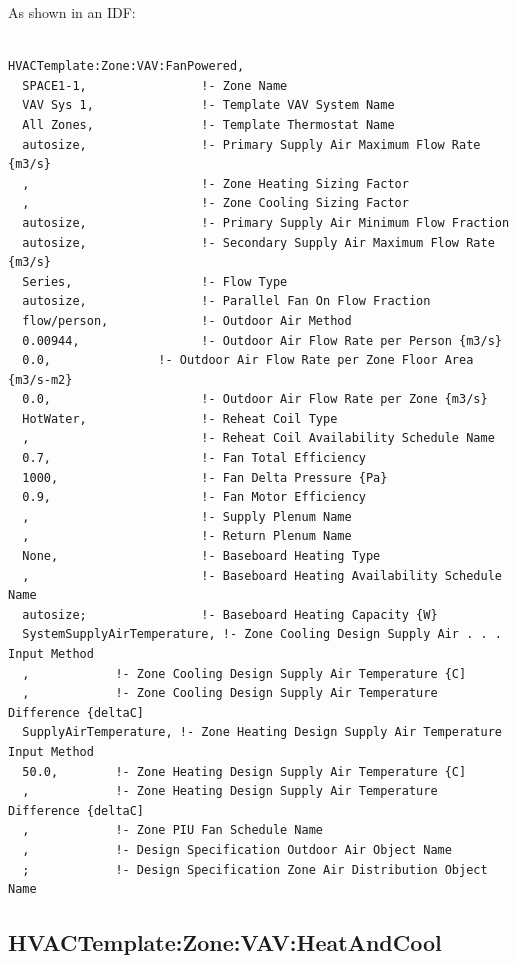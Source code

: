 As shown in an IDF:

\begin{lstlisting}

HVACTemplate:Zone:VAV:FanPowered,
  SPACE1-1,                !- Zone Name
  VAV Sys 1,               !- Template VAV System Name
  All Zones,               !- Template Thermostat Name
  autosize,                !- Primary Supply Air Maximum Flow Rate {m3/s}
  ,                        !- Zone Heating Sizing Factor
  ,                        !- Zone Cooling Sizing Factor
  autosize,                !- Primary Supply Air Minimum Flow Fraction
  autosize,                !- Secondary Supply Air Maximum Flow Rate {m3/s}
  Series,                  !- Flow Type
  autosize,                !- Parallel Fan On Flow Fraction
  flow/person,             !- Outdoor Air Method
  0.00944,                 !- Outdoor Air Flow Rate per Person {m3/s}
  0.0,               !- Outdoor Air Flow Rate per Zone Floor Area {m3/s-m2}
  0.0,                     !- Outdoor Air Flow Rate per Zone {m3/s}
  HotWater,                !- Reheat Coil Type
  ,                        !- Reheat Coil Availability Schedule Name
  0.7,                     !- Fan Total Efficiency
  1000,                    !- Fan Delta Pressure {Pa}
  0.9,                     !- Fan Motor Efficiency
  ,                        !- Supply Plenum Name
  ,                        !- Return Plenum Name
  None,                    !- Baseboard Heating Type
  ,                        !- Baseboard Heating Availability Schedule Name
  autosize;                !- Baseboard Heating Capacity {W}
  SystemSupplyAirTemperature, !- Zone Cooling Design Supply Air . . . Input Method
  ,            !- Zone Cooling Design Supply Air Temperature {C]
  ,            !- Zone Cooling Design Supply Air Temperature Difference {deltaC]
  SupplyAirTemperature, !- Zone Heating Design Supply Air Temperature Input Method
  50.0,        !- Zone Heating Design Supply Air Temperature {C]
  ,            !- Zone Heating Design Supply Air Temperature Difference {deltaC]
  ,            !- Zone PIU Fan Schedule Name
  ,            !- Design Specification Outdoor Air Object Name
  ;            !- Design Specification Zone Air Distribution Object Name
\end{lstlisting}

\subsection{HVACTemplate:Zone:VAV:HeatAndCool}\label{hvactemplatezonevavheatandcool}

